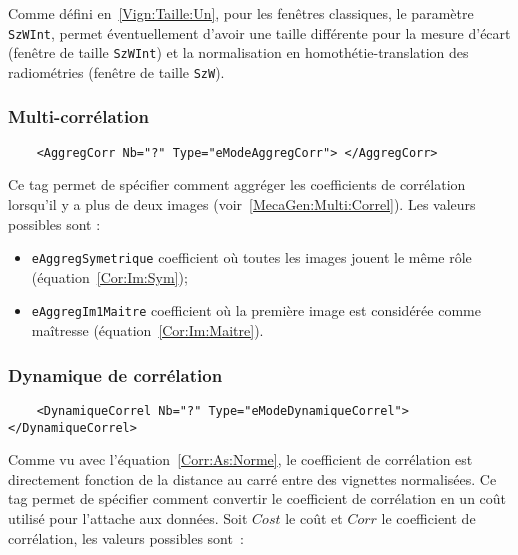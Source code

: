 Comme d\'efini en~\ref{Vign:Taille:Un}, pour les fen\^etres classiques,
le param\`etre {\tt SzWInt}, permet \'eventuellement d'avoir une taille
diff\'erente pour la  mesure d'\'ecart (fen\^etre de taille
{\tt SzWInt}) et la normalisation en homoth\'etie-translation
des radiom\'etries (fen\^etre de taille {\tt SzW}).

\subsubsection{Multi-corr\'elation}

\label{Multi:Correl:Coef}

\begin{verbatim}
    <AggregCorr Nb="?" Type="eModeAggregCorr"> </AggregCorr>
\end{verbatim}

Ce tag permet de sp\'ecifier comment aggr\'eger les coefficients
de corr\'elation lorsqu'il y a plus de deux images
(voir~\ref{MecaGen:Multi:Correl}). Les valeurs possibles sont :

\begin{itemize}
   \item {\tt eAggregSymetrique} coefficient o\`u toutes les images
         jouent le m\^eme r\^ole (\'equation~\ref{Cor:Im:Sym});

   \item {\tt eAggregIm1Maitre}  coefficient o\`u  la premi\`ere
         image est consid\'er\'ee comme ma\^itresse
         (\'equation~\ref{Cor:Im:Maitre}).
\end{itemize}



\subsubsection{Dynamique de corr\'elation}

\begin{verbatim}
    <DynamiqueCorrel Nb="?" Type="eModeDynamiqueCorrel"> </DynamiqueCorrel>
\end{verbatim}

Comme vu avec l'\'equation~\ref{Corr:As:Norme}, le coefficient
de corr\'elation est directement fonction de la distance au carr\'e
entre des vignettes normalis\'ees. Ce tag permet de sp\'ecifier
comment convertir le coefficient de corr\'elation en un co\^ut
utilis\'e pour l'attache aux donn\'ees. Soit $Cost$ le co\^ut
et $Corr$ le coefficient de corr\'elation, les valeurs possibles
sont~:


